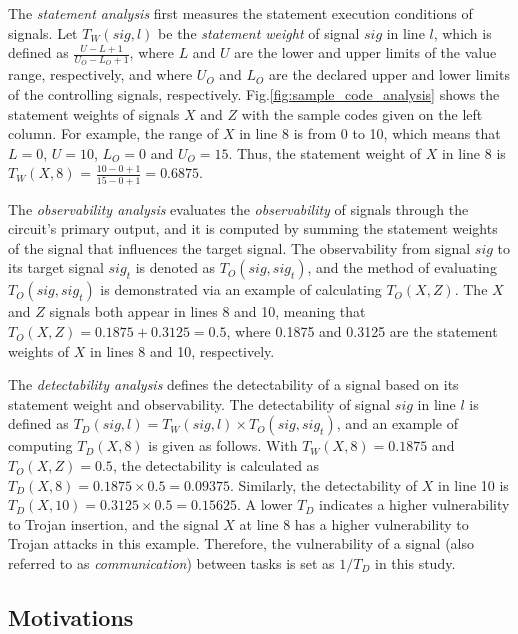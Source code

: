 \documentclass[10pt,journal, compsoc]{IEEEtran}
\begin{document}

The \textit{statement analysis} first measures the statement execution conditions of signals. Let $T_W(sig, l)$ be the \textit{statement weight} of signal $sig$ in line $l$, which is defined as $\frac{U-L+1}{U_O-L_O+1}$, where $L$ and $U$ are the lower and upper limits of the value range, respectively, and where $U_O$ and $L_O$ are the declared upper and lower limits of the controlling signals, respectively. Fig.\ref{fig:sample_code_analysis} shows the statement weights of signals $X$ and $Z$ with the sample codes given on the left column. For example, the range of $X$ in line 8 is from 0 to 10, which means that $L = 0$, $U = 10$, $L_O = 0$ and $U_O = 15$. Thus, the statement weight of $X$ in line 8  is $T_W(X,8)$ = $\frac{10-0+1}{15-0+1} = 0.6875$.

The \textit{observability analysis} evaluates the \textit{observability} of signals through the circuit's primary output, and it is computed by summing the statement weights of the signal that influences the target signal. The observability from signal $sig$ to its target signal $sig_t$ is denoted as $T_O(sig, sig_t)$, and the method of evaluating $T_O(sig, sig_t)$ is demonstrated via an example of calculating $T_O(X, Z)$. The $X$ and $Z$ signals both appear in lines 8 and 10, meaning that $T_O(X, Z)=0.1875 + 0.3125 = 0.5$, where 0.1875 and 0.3125 are the statement weights of $X$ in lines 8 and 10, respectively.

The \textit{detectability analysis} defines the detectability of a signal based on its statement weight and observability. The detectability of signal $sig$ in line $l$ is defined as $T_D(sig,l) = T_W(sig,l) \times T_O(sig,sig_t)$, and an example of computing $T_D(X,8)$ is given as follows. With $T_W(X,8)=0.1875$ and $T_O(X,Z)=0.5$, the detectability is calculated as $T_D(X,8) = 0.1875 \times 0.5 = 0.09375$. Similarly, the detectability of $X$ in line 10 is $T_D(X,10) = 0.3125 \times 0.5 = 0.15625$. A lower $T_D$ indicates a higher vulnerability to Trojan insertion, and the signal $X$ at line 8 has a higher vulnerability to Trojan attacks in this example. Therefore, the vulnerability of a signal (also referred to as \textit{communication})  between tasks is set as $1/T_D$ in this study.



\subsection{Motivations}
\end{document}
